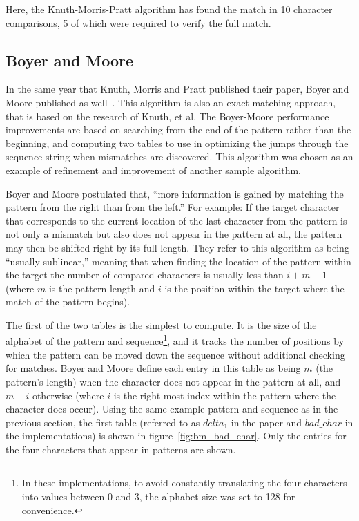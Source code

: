 Here, the Knuth-Morris-Pratt algorithm has found the match in 10 character comparisons, 5 of which were required to verify the full match.

\subsection{Boyer and Moore}

In the same year that Knuth, Morris and Pratt published their paper, Boyer and Moore published as well~\cite{boyer}. This algorithm is also an exact matching approach, that is based on the research of Knuth, et al. The Boyer-Moore performance improvements are based on searching from the end of the pattern rather than the beginning, and computing two tables to use in optimizing the jumps through the sequence string when mismatches are discovered. This algorithm was chosen as an example of refinement and improvement of another sample algorithm.

Boyer and Moore postulated that, ``more information is gained by matching the pattern from the right than from the left.'' For example: If the target character that corresponds to the current location of the last character from the pattern is not only a mismatch but also does not appear in the pattern at all, the pattern may then be shifted right by its full length. They refer to this algorithm as being ``usually sublinear,'' meaning that when finding the location of the pattern within the target the number of compared characters is usually less than $i+m-1$ (where $m$ is the pattern length and $i$ is the position within the target where the match of the pattern begins).

The first of the two tables is the simplest to compute. It is the size of the alphabet of the pattern and sequence\footnote{In these implementations, to avoid constantly translating the four characters into values between 0 and 3, the alphabet-size was set to 128 for convenience.}, and it tracks the number of positions by which the pattern can be moved down the sequence without additional checking for matches. Boyer and Moore define each entry in this table as being $m$ (the pattern's length) when the character does not appear in the pattern at all, and $m - i$ otherwise (where $i$ is the right-most index within the pattern where the character does occur). Using the same example pattern and sequence as in the previous section, the first table (referred to as $delta_1$ in the paper and $bad\_char$ in the implementations) is shown in figure~\ref{fig:bm_bad_char}. Only the entries for the four characters that appear in patterns are shown.


